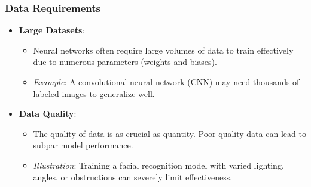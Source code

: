 \documentclass[aspectratio=169]{beamer}
\begin{document}
\begin{frame}[fragile]
    \frametitle{Data Requirements}
    \begin{itemize}
        \item \textbf{Large Datasets}: 
        \begin{itemize}
            \item Neural networks often require large volumes of data to train effectively due to numerous parameters (weights and biases).
            \item \textit{Example}: A convolutional neural network (CNN) may need thousands of labeled images to generalize well.
        \end{itemize}
        
        \item \textbf{Data Quality}: 
        \begin{itemize}
            \item The quality of data is as crucial as quantity. Poor quality data can lead to subpar model performance.
            \item \textit{Illustration}: Training a facial recognition model with varied lighting, angles, or obstructions can severely limit effectiveness.
        \end{itemize}
    \end{itemize}
\end{frame}
\end{document}
